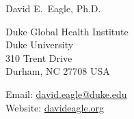 \documentclass[12pt, letter]{article}
\makeatletter
\newcommand{\FirstName}{David E.}
\newcommand{\LastName}{Eagle}
\newcommand{\Degree}{Ph.D.}
\newcommand{\MyName}{\FirstName\ \LastName, \Degree}
\newcommand{\Email}{david.eagle@duke.edu}
\newcommand{\Website}{davideagle.org}
\newcommand{\Affiliation}{
Duke Global Health Institute\\
Duke University
}
\newcommand{\Address}{
    310 Trent Drive\\
    Durham, NC 27708 USA
}
\makeatother
\begin{document}
\setlength{\LTpre}{0pt}
\setlength{\LTpost}{2ex}

\thispagestyle{empty}

\begin{center}
    {\fontsize{24pt}{0}\selectfont \MyName}
    \\[0.3cm]
\end{center}

  \noindent
\begin{minipage}{.6\textwidth}
\Affiliation\\
\Address\\
\end{minipage}
\begin{minipage}{.4\textwidth}
\flushright
Email: \href{mailto:\Email}{\texttt\small{\Email}}\\
Website: {\texttt\small\href{\Website}{\Website}}\\

\end{minipage}

\vspace{-1em}








%
\end{document}
